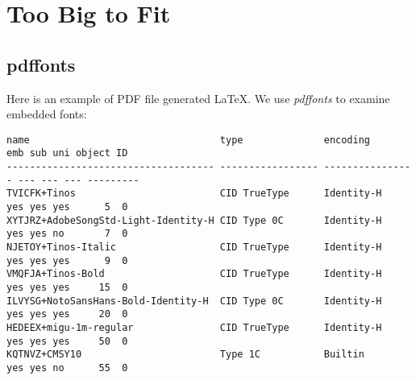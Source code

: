 \appendix

\chapter{Too Big to Fit}
\label{cha:too-big-fit}

\section{pdffonts}
\label{sec:pdffonts}

Here is an example of PDF file generated \LaTeX{}. We use
\textit{pdffonts} to examine embedded fonts:
  
\begin{landscape}
\begin{lstlisting}[language={},caption={\LaTeX{} 内嵌字体},frame={tb},label={pdffonts}]
name                                 type              encoding         emb sub uni object ID
------------------------------------ ----------------- ---------------- --- --- --- ---------
TVICFK+Tinos                         CID TrueType      Identity-H       yes yes yes      5  0
XYTJRZ+AdobeSongStd-Light-Identity-H CID Type 0C       Identity-H       yes yes no       7  0
NJETOY+Tinos-Italic                  CID TrueType      Identity-H       yes yes yes      9  0
VMQFJA+Tinos-Bold                    CID TrueType      Identity-H       yes yes yes     15  0
ILVYSG+NotoSansHans-Bold-Identity-H  CID Type 0C       Identity-H       yes yes yes     20  0
HEDEEX+migu-1m-regular               CID TrueType      Identity-H       yes yes yes     50  0
KQTNVZ+CMSY10                        Type 1C           Builtin          yes yes no      55  0
\end{lstlisting}  
\end{landscape}

